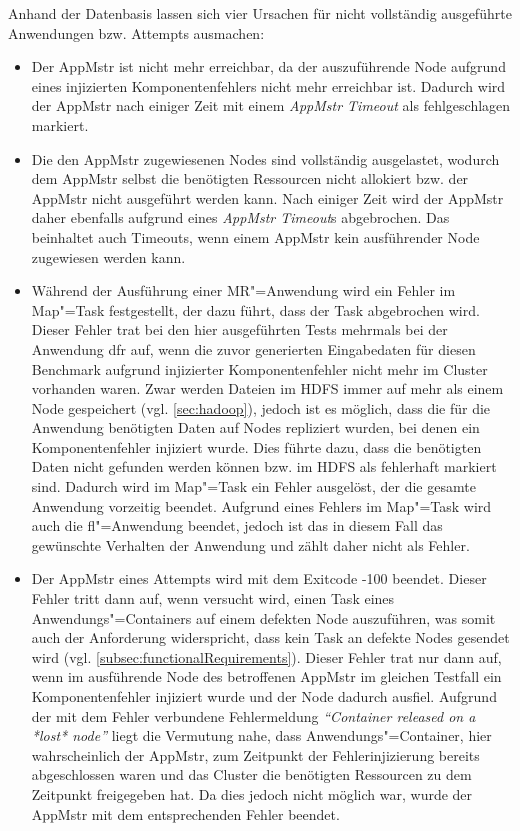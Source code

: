 Anhand der Datenbasis lassen sich vier Ursachen für nicht vollständig ausgeführte Anwendungen bzw. Attempts ausmachen:

\begin{itemize}
    \item
        Der \gls{AppMstr} ist nicht mehr erreichbar, da der auszuführende Node aufgrund eines injizierten Komponentenfehlers nicht mehr erreichbar ist.
        Dadurch wird der \gls{AppMstr} nach einiger Zeit mit einem \emph{\gls{AppMstr} Timeout} als fehlgeschlagen markiert.
    \item
        Die den \gls{AppMstr} zugewiesenen Nodes sind vollständig ausgelastet, wodurch dem \gls{AppMstr} selbst die benötigten Ressourcen nicht allokiert bzw. der \gls{AppMstr} nicht ausgeführt werden kann.
        Nach einiger Zeit wird der \gls{AppMstr} daher ebenfalls aufgrund eines \emph{\gls{AppMstr} Timeout}s abgebrochen.
        Das beinhaltet auch Timeouts, wenn einem \gls{AppMstr} kein ausführender Node zugewiesen werden kann.
    \item
        Während der Ausführung einer \gls{MR}"=Anwendung wird ein Fehler im Map"=Task festgestellt, der dazu führt, dass der Task abgebrochen wird.
        Dieser Fehler trat bei den hier ausgeführten Tests mehrmals bei der Anwendung \acrlong{dfr} auf, wenn die zuvor generierten Eingabedaten für diesen Benchmark aufgrund injizierter Komponentenfehler nicht mehr im Cluster vorhanden waren.
        Zwar werden Dateien im HDFS immer auf mehr als einem Node gespeichert (vgl. \cref{sec:hadoop}), jedoch ist es möglich, dass die für die Anwendung benötigten Daten auf Nodes repliziert wurden, bei denen ein Komponentenfehler injiziert wurde.
        Dies führte dazu, dass die benötigten Daten nicht gefunden werden können bzw. im HDFS als fehlerhaft markiert sind.
        Dadurch wird im Map"=Task ein Fehler ausgelöst, der die gesamte Anwendung vorzeitig beendet.
        Aufgrund eines Fehlers im Map"=Task wird auch die \acrlong{fl}"=Anwendung beendet, jedoch ist das in diesem Fall das gewünschte Verhalten der Anwendung und zählt daher nicht als Fehler.
    \item
        Der \gls{AppMstr} eines Attempts wird mit dem Exitcode -100 beendet.
        Dieser Fehler tritt dann auf, wenn versucht wird, einen Task eines Anwendungs"=Containers auf einem defekten Node auszuführen, was somit auch der Anforderung widerspricht, dass kein Task an defekte Nodes gesendet wird (vgl. \cref{subsec:functionalRequirements}).
        Dieser Fehler trat nur dann auf, wenn im ausführende Node des betroffenen \gls{AppMstr} im gleichen Testfall ein Komponentenfehler injiziert wurde und der Node dadurch ausfiel.
        Aufgrund der mit dem Fehler verbundene Fehlermeldung \emph{\enquote{Container released on a *lost* node}} liegt die Vermutung nahe, dass Anwendungs"=Container, hier wahrscheinlich der \gls{AppMstr}, zum Zeitpunkt der Fehlerinjizierung bereits abgeschlossen waren und das Cluster die benötigten Ressourcen zu dem Zeitpunkt freigegeben hat.
        Da dies jedoch nicht möglich war, wurde der \gls{AppMstr} mit dem entsprechenden Fehler beendet.
\end{itemize}

